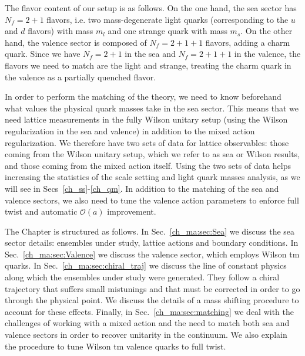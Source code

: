 The flavor content of our setup is as follows. On the one hand, the sea sector has $N_f=2+1$ flavors, i.e. two mass-degenerate light quarks (corresponding to the $u$ and $d$ flavors) with mass $m_l$ and one strange quark with mass $m_s$. On the other hand, the valence sector is composed of $N_f=2+1+1$ flavors, adding a charm quark. Since we have $N_f=2+1$ in the sea and $N_f=2+1+1$ in the valence, the flavors we need to match are the light and strange, treating the charm quark in the valence as a partially quenched flavor. 

In order to perform the matching of the theory, we need to know beforehand what values the physical quark masses take in the sea sector. This means that we need lattice measurements in the fully Wilson unitary setup (using the Wilson regularization in the sea and valence) in addition to the mixed action regularization. We therefore have two sets of data for lattice observables: those coming from the Wilson unitary setup, which we refer to as sea or Wilson results, and those coming from the mixed action itself. Using the two sets of data helps increasing the statistics of the scale setting and light quark masses analysis, as we will see in Secs~\ref{ch_ss}-\ref{ch_qm}. In addition to the matching of the sea and valence sectors, we also need to tune the valence action parameters to enforce full twist and automatic $\mathcal{O}(a)$ improvement.

The Chapter is structured as follows. In Sec.~\ref{ch_ma:sec:Sea} we discuss the sea sector details: ensembles under study, lattice actions and boundary conditions. In Sec.~\ref{ch_ma:sec:Valence} we discuss the valence sector, which employs Wilson tm quarks. In Sec.~\ref{ch_ma:sec:chiral_traj} we discuss the line of constant physics along which the ensembles under study were generated. They follow a chiral trajectory that suffers small mistunings and that must be corrected in order to go through the physical point. We discuss the details of a mass shifting procedure to account for these effects. Finally, in Sec.~\ref{ch_ma:sec:matching} we deal with the challenges of working with a mixed action and the need to match both sea and valence sectors in order to recover unitarity in the continuum. We also explain the procedure to tune Wilson tm valence quarks to full twist.


